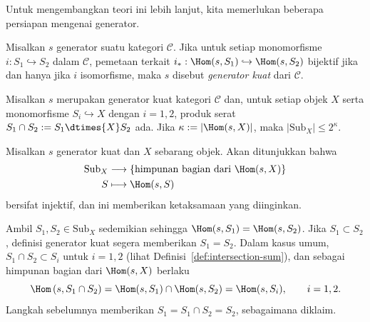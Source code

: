 Untuk mengembangkan teori ini lebih lanjut, kita memerlukan beberapa persiapan
mengenai generator.

\begin{definisi}
Misalkan $s$ generator suatu kategori $\mathcal{C}$. Jika untuk setiap
monomorfisme $i:S_1\hookrightarrow S_2$ dalam $\mathcal{C}$, pemetaan terkait
$i_*:\Hom(s,S_1)\hookrightarrow\Hom(s,S_2)$ bijektif jika dan hanya jika $i$
isomorfisme, maka $s$ disebut \emph{generator kuat} dari $\mathcal{C}$.
\end{definisi}

\begin{proposisi}\label{prop:strong-generator-well-powered}
Misalkan $s$ merupakan generator kuat kategori $\mathcal{C}$ dan, untuk setiap
objek $X$ serta monomorfisme $S_i\hookrightarrow X$ dengan $i=1,2$, produk serat
$S_1\cap S_2:=S_1\dtimes{X}S_2$ ada. Jika
$\kappa:=|\Hom(s,X)|$, maka $|\mathrm{Sub}_X|\leq2^\kappa$.
\end{proposisi}
\begin{bukti}
Misalkan $s$ generator kuat dan $X$ sebarang objek. Akan ditunjukkan bahwa
\begin{align*}
	\mathrm{Sub}_X&\longrightarrow
	\left\{\text{himpunan bagian dari }\Hom(s,X)\right\}\\
	S&\longmapsto\Hom(s,S)
\end{align*}
bersifat injektif, dan ini memberikan ketaksamaan yang diinginkan.

Ambil $S_1,S_2\in\mathrm{Sub}_X$ sedemikian sehingga
$\Hom(s,S_1)=\Hom(s,S_2)$. Jika $S_1\subset S_2$, definisi generator kuat
segera memberikan $S_1=S_2$. Dalam kasus umum,
$S_1\cap S_2\subset S_i$ untuk $i=1,2$ (lihat
Definisi~\ref{def:intersection-sum}), dan sebagai himpunan bagian dari
$\Hom(s,X)$ berlaku
\[\Hom\left(s,S_1\cap S_2\right)
=\Hom(s,S_1)\cap\Hom(s,S_2)=\Hom(s,S_i),\qquad i=1,2.\]
Langkah sebelumnya memberikan $S_1=S_1\cap S_2=S_2$, sebagaimana diklaim.
\end{bukti}

